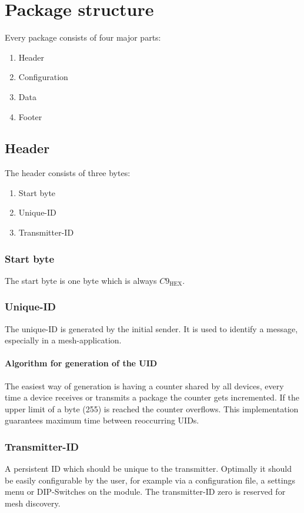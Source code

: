 \documentclass{scrreprt}
\begin{document}
\section{Package structure}
Every package consists of four major parts:
\begin{enumerate}
  \item Header
  \item Configuration
  \item Data
  \item Footer
\end{enumerate}

\subsection{Header}
The header consists of three bytes:
\begin{enumerate}
  \item Start byte
  \item Unique-ID
  \item Transmitter-ID
\end{enumerate}

\subsubsection{Start byte}
The start byte is one byte which is always ${C9}_\text{HEX}$.

\subsubsection{Unique-ID}
 The unique-ID is generated by the initial sender. It is used to identify a
 message, especially in a mesh-application.

\paragraph{Algorithm for generation of the UID}
 The easiest way of generation is having a counter shared by all devices,
 every time a device receives or transmits a package the counter gets
 incremented. If the upper limit of a byte (255) is reached the counter
 overflows. This implementation guarantees maximum time between reoccurring
 UIDs.

\subsubsection{Transmitter-ID}
 A persistent ID which should be unique to the transmitter. Optimally it
 should be easily configurable by the user, for example via a configuration
 file, a settings menu or DIP-Switches on the module. The transmitter-ID zero
 is reserved for mesh discovery.
\end{document}
